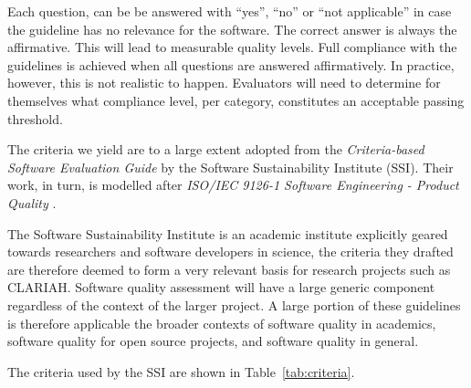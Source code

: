 \documentclass[a4paper,11pt]{article}
\begin{document}
Each question, can be be answered with ``yes'', ``no'' or ``not applicable'' in
case the guideline has no relevance for the software. The correct answer is
always the affirmative. This will lead to measurable quality levels. Full
compliance with the guidelines is achieved when all questions are answered
affirmatively.  In practice, however, this is not realistic to happen.
Evaluators will need to determine for themselves what compliance level, per
category, constitutes an acceptable passing threshold.

The criteria we yield are  to a large extent adopted from the
\emph{Criteria-based Software Evaluation Guide} \citep{SSIGUIDE} by the Software
Sustainability Institute (SSI). Their work, in turn, is modelled after
\emph{ISO/IEC 9126-1 Software Engineering - Product Quality} \citep{ISO9126}.
%
%
%

The Software Sustainability Institute\citep{SSIGENERAL} is an academic institute
explicitly geared towards researchers and software developers in science, the
criteria they drafted are therefore deemed to form a very relevant basis for
research projects such as CLARIAH. Software quality assessment will have a
large generic component regardless of the context of the larger project. A
large portion of these guidelines is therefore applicable the broader contexts
of software quality in academics, software quality for open source projects, and
software quality in general.

The criteria used by the SSI are shown in Table~\ref{tab:criteria}.
\end{document}
